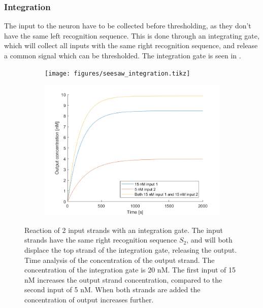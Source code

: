 \subsubsection{Integration}
The input to the neuron have to be collected before thresholding, as they don't have the same left recognition sequence. This is done through an integrating gate, which will collect all inputs with the same right recognition sequence, and release a common signal which can be thresholded. The integration gate is seen in .

\begin{figure}[h]
\begin{subfigure}[t]{.49\textwidth}
  \texttt{[image: figures/seesaw\_integration.tikz]}
  \caption{}
  \label{seesaw_integration_reaction}
\end{subfigure}
\hfill
\begin{subfigure}[t]{.49\columnwidth}
  \includegraphics[width=\linewidth]{images/integration.png}
  \caption{}
  \label{seesaw_integration_time}
\end{subfigure}
\caption{ Reaction of 2 input strands with an integration gate. The input strands have the same right recognition sequence $S_2$, and will both displace the top strand of the integration gate, releasing the output.  Time analysis of the concentration of the output strand. The concentration of the integration gate is 20 nM. The first input of 15 nM increases the output strand concentration, compared to the second input of 5 nM. When both strands are added the concentration of output increases further.}
\label{seesaw_integration}
\end{figure}


